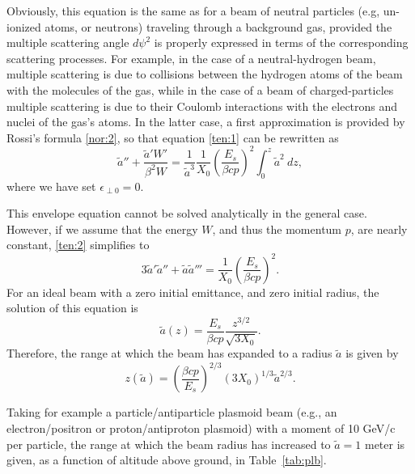 \documentclass [12pt,a4paper,     ]{report} %
\newcommand{\tr}{\pmb{\perp}}         %
\begin{document}
   Obviously, this equation is the same as for a beam of neutral particles (e.g, un-ionized atoms, or neutrons) traveling through a background gas, provided the multiple scattering angle $d\psi^2$ is properly expressed in terms of the corresponding scattering processes.  For example, in the case of a neutral-hydrogen beam, multiple scattering is due to collisions between the hydrogen atoms of the beam with the molecules of the gas, while in the case of a beam of charged-particles multiple scattering is due to their Coulomb interactions with the electrons and nuclei of the gas's atoms.  In the latter case, a first approximation is provided by Rossi's formula \eqref{nor:2}, so that equation \eqref{ten:1} can be rewritten as
%
\begin{equation}\label{ten:2} %
    \tilde{a}'' + \frac{\tilde{a}'W'}{\beta^2W}
                = \frac{1}{\tilde{a}^3}
                  \frac{1}{X_0}
                 (\frac{E_s}{\beta c p})^2
                  \int_0^z \tilde{a}^2 ~ dz,
\end{equation}
%
where we have set $\epsilon_{\tr 0}=0$.

This envelope equation cannot be solved analytically in the general case.  However, if we assume that the energy $W$, and thus the momentum $p$, are nearly constant, \eqref{ten:2} simplifies to
%
\begin{equation}\label{ten:3} %
       3 \tilde{a}'\tilde{a}'' + \tilde{a} \tilde{a}'''
                   = \frac{1}{X_0}  (\frac{E_s}{\beta c p})^2.
\end{equation}
%
For an ideal beam with a zero initial emittance, and zero initial radius, the solution of this equation is
%
\begin{equation}\label{ten:4} %
      \tilde{a}(z) = \frac{E_s}{\beta c p} \frac{z^{3/2}}{\sqrt{3X_0}}.
\end{equation}
%
Therefore, the range at which the beam has expanded to a radius $\tilde{a}$ is given by
%
\begin{equation}\label{ten:5} %
    z({\tilde{a}}) = (\frac{\beta c p}{E_s})^{2/3} (3X_0)^{1/3}\tilde{a}^{2/3}.
\end{equation}
%

Taking for example a particle/antiparticle plasmoid beam (e.g., an electron/po\-si\-tron or proton/antiproton plasmoid) with a moment of 10 GeV/c per particle, the range at which the beam radius has increased to $\tilde{a}=1$ meter is given, as a function of altitude above ground, in Table~\ref{tab:plb}.
\end{document}

